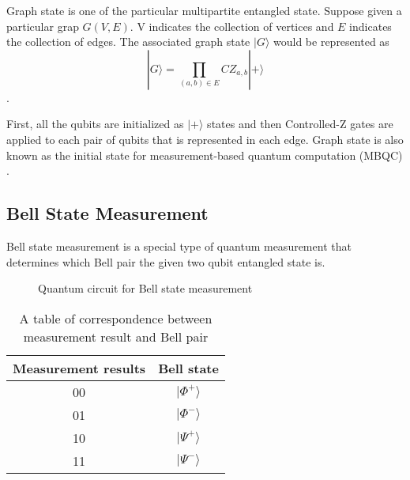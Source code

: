 Graph state is one of the particular multipartite entangled state. Suppose given a particular grap $G(V, E)$.
V indicates the collection of vertices and $E$ indicates the collection of edges.
The associated graph state $|G\rangle$ would be represented as 
\begin{equation}
  |G\rangle = \prod_{(a,b) \in E} CZ_{a,b} |+\rangle
\end{equation}.

First, all the qubits are initialized as $|+ \rangle$ states and then Controlled-Z gates are applied to each pair of qubits that is represented in each edge.
Graph state is also known as the initial state for measurement-based quantum computation (MBQC) \cite{PhysRevLett.86.5188}. 

\subsection{Bell State Measurement}
Bell state measurement is a special type of quantum measurement that determines which Bell pair the given two qubit entangled state is.
\begin{figure}[ht]
  \begin{center}
\caption{Quantum circuit for Bell state measurement}
\end{center}
\end{figure}

\begin{table}[ht]
  \begin{center}
    \begin{tabular}{|c|c|} \hline
      Measurement results & Bell state \\ \hline \cline{1-2}
      00 &  $|\Phi^+\rangle$ \\ \cline{1-2}
      01 & $|\Phi^-\rangle$ \\  \cline{1-2}
      10 &  $|\Psi^+\rangle$ \\ \cline{1-2}
      11 & $|\Psi^-\rangle$ \\  \hline  \cline{1-2}
    \end{tabular}
    \caption{A table of correspondence between measurement result and Bell pair}
  \end{center}
\end{table}

